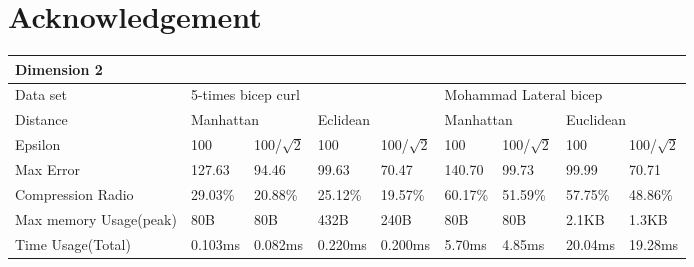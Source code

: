 \documentclass[10pt, conference, compsocconf]{IEEEtran}
\begin{document}
\section*{Acknowledgement}
\begin{table*}[]
    \begin{tabular}{|l|l|l|l|l|l|l|l|l|}
    \hline
    \multicolumn{9}{|l|}{Dimension 2}                                                                                                                         \\ \hline
    Data set               & \multicolumn{4}{l|}{5-times bicep curl}                        & \multicolumn{4}{l|}{Mohammad Lateral bicep}                     \\ \hline
    Distance               & \multicolumn{2}{l|}{Manhattan} & \multicolumn{2}{l|}{Eclidean} & \multicolumn{2}{l|}{Manhattan} & \multicolumn{2}{l|}{Euclidean} \\ \hline
    Epsilon                & 100          & 100/$\sqrt{2}$  & 100         & 100/$\sqrt{2}$  & 100        & 100/$\sqrt{2}$    & 100        & 100/$\sqrt{2}$    \\ \hline
    Max Error              & 127.63       & 94.46           & 99.63       & 70.47           & 140.70     & 99.73             & 99.99      & 70.71             \\ \hline
    Compression Radio      & 29.03\%      & 20.88\%         & 25.12\%     & 19.57\%         & 60.17\%    & 51.59\%           & 57.75\%    & 48.86\%           \\ \hline
    Max memory Usage(peak) & 80B          & 80B             & 432B        & 240B            & 80B        & 80B               & 2.1KB      & 1.3KB             \\ \hline
    Time Usage(Total)      & 0.103ms      & 0.082ms         & 0.220ms     & 0.200ms         & 5.70ms     & 4.85ms            & 20.04ms    & 19.28ms           \\ \hline
    \end{tabular}
\end{table*}
\end{document}
